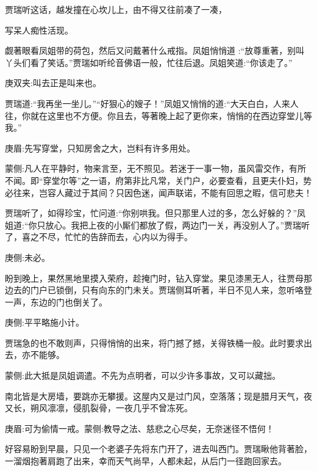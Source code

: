 \begin{parag}
    贾瑞听这话，越发撞在心坎儿上，由不得又往前凑了一凑，\begin{note}写呆人痴性活现。\end{note}觑著眼看凤姐带的荷包，然后又问戴著什么戒指。凤姐悄悄道 :“放尊重著，别叫丫头们看了笑话。”贾瑞如听纶音佛语一般，忙往后退。凤姐笑道:“你该走了。”\begin{note}庚双夹:叫去正是叫来也。\end{note}贾瑞道:“我再坐一坐儿。”“好狠心的嫂子！”凤姐又悄悄的道:“大天白白，人来人往，你就在这里也不方便。你且去，等著晚上起了更你来，悄悄的在西边穿堂儿等我。”\begin{note}庚眉:先写穿堂，只知房舍之大，岂料有许多用处。\end{note}\begin{note}蒙侧:凡人在平静时，物来言至，无不照见。若迷于一事一物，虽风雷交作，有所不闻。即“穿堂尔等”之一语，府第非比凡常，关门户，必要查看，且更夫仆妇，势必往来，岂容人藏过于其间？只因色迷，闻声联诺，不能有回思之暇，信可悲夫！\end{note}贾瑞听了，如得珍宝，忙问道:“你别哄我。但只那里人过的多，怎么好躲的？”凤姐道:“你只放心。我把上夜的小厮们都放了假，两边门一关，再没别人了。”贾瑞听了，喜之不尽，忙忙的告辞而去，心内以为得手。\begin{note}庚侧:未必。\end{note}
\end{parag}


\begin{parag}
    盼到晚上，果然黑地里摸入荣府，趁掩门时，钻入穿堂。果见漆黑无人，往贾母那边去的门户已锁倒，只有向东的门未关。贾瑞侧耳听著，半日不见人来，忽听咯登一声，东边的门也倒关了。\begin{note}庚侧:平平略施小计。\end{note}贾瑞急的也不敢则声，只得悄悄的出来，将门撼了撼，关得铁桶一般。此时要求出去，亦不能够。\begin{note}蒙侧:此大抵是凤姐调遣。不先为点明者，可以少许多事故，又可以藏拙。\end{note}南北皆是大房墙，要跳亦无攀援。这屋内又是过门风，空落落；现是腊月天气，夜又长，朔风凛凛，侵肌裂骨，一夜几乎不曾冻死。\begin{note}庚眉:可为偷情一戒。蒙侧:教导之法、慈悲之心尽矣，无奈迷径不悟何！\end{note}好容易盼到早晨，只见一个老婆子先将东门开了，进去叫西门。贾瑞瞅他背著脸，一溜烟抱著肩跑了出来，幸而天气尚早，人都未起，从后门一径跑回家去。
\end{parag}


